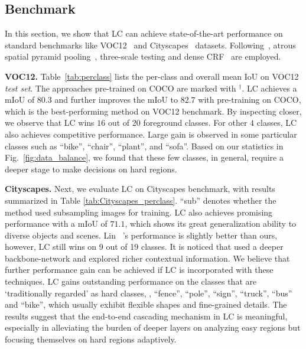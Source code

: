 \documentclass[10pt,twocolumn,letterpaper]{article}
\begin{document}
\subsection{Benchmark}

In this section, we show that LC can achieve state-of-the-art performance on standard benchmarks like VOC12~\cite{everingham2010pascal} and Cityscapes~\cite{Cordts2016Cityscapes} datasets. 
Following~\cite{CP2016Deeplab}, atrous spatial pyramid pooling~\cite{CP2016Deeplab}, three-scale testing and dense CRF~\cite{koltun2011efficient} are employed.

\noindent
\textbf{VOC12.}
Table~\ref{tab:perclass} lists the per-class and overall mean IoU on VOC12 \textit{test set}.
The approaches pre-trained on COCO \cite{lin2014microsoft} are marked with $^\dagger$.
LC achieves a mIoU of $80.3$ and further improves the mIoU to $82.7$ with pre-training on COCO, which is the best-performing method on VOC12 benchmark.
By inspecting closer, we observe that LC wins $16$ out of $20$ foreground classes. For other $4$ classes, LC also achieves competitive performance. Large gain is observed in some particular classes such as ``bike'', ``chair'', ``plant'', and ``sofa''. Based on our statistics in Fig.~\ref{fig:data_balance}, we found that these few classes, in general, require a deeper stage to make decisions on hard regions. 







\noindent
\textbf{Cityscapes.}
Next, we evaluate LC on Cityscapes benchmark, with results summarized in Table \ref{tab:Cityscapes_perclass}.
``sub'' denotes whether the method used subsampling images for training.
LC also achieves promising performance with a mIoU of $71.1$, which shows its great generalization ability to diverse objects and scenes.
Lin \etal~\cite{lin2015efficient}'s performance is slightly better than ours, however, LC still wins on 9 out of 19 classes. It is noticed that \cite{lin2015efficient} used a deeper backbone-network and explored richer contextual information. We believe that further performance gain can be achieved if LC is incorporated with these techniques.
LC gains outstanding performance on the classes that are `traditionally regarded' as hard classes, \eg, ``fence'', ``pole'', ``sign'', ``truck'', ``bus'' and ``bike'', which usually exhibit flexible shapes and fine-grained details.
The results suggest that the end-to-end cascading mechanism in LC is meaningful, especially in alleviating the burden of deeper layers on analyzing easy regions but focusing themselves on hard regions adaptively.
\end{document}
